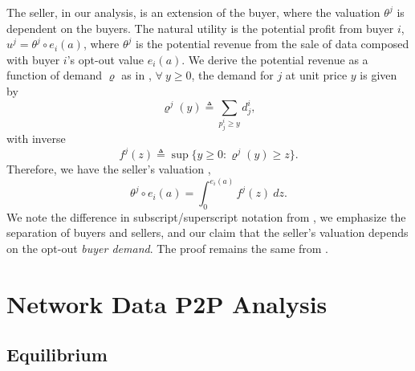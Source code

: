 \documentclass[12pt]{article}
\theoremstyle{definition}
\begin{document}
\begin{multicols}{2}
The seller, in our analysis, is an extension of the buyer, where the valuation
$\theta^j$ is dependent on the buyers. The natural utility is the potential
profit from buyer $i$, $u^j = \theta^j\circ e_i(a)$, where $\theta^j$ is the
potential revenue from the sale of data composed with buyer $i$'s opt-out value
$e_i(a)$. We derive the potential revenue as a function of demand $\varrho$ as in
\cite{semret}, $\forall \ y\ge 0$, the demand for $j$ at unit price $y$ is given by
$$
    \varrho^j(y) \triangleq \displaystyle\sum_{p_j^i\ge y} d_j^i,
$$
with inverse
$$
    f^j(z) \triangleq \sup\big\lbrace y\ge 0: \varrho^j(y) \ge z\big\rbrace.
$$
Therefore, we have the seller's valuation \cite{semret}, 
$$
    \theta^j\circ e_i(a) = \displaystyle\int_0^{e_i(a)} f^j(z) \ dz.
$$
We note the difference in subscript/superscript notation from \cite{semret},
 we emphasize the separation of buyers and sellers, and our
claim that the seller's valuation depends on the opt-out \emph{buyer demand}.
The proof remains the same from \cite{semret}.

\section{Network Data P2P Analysis}

\subsection{Equilibrium}


\end{multicols}
\end{document}
